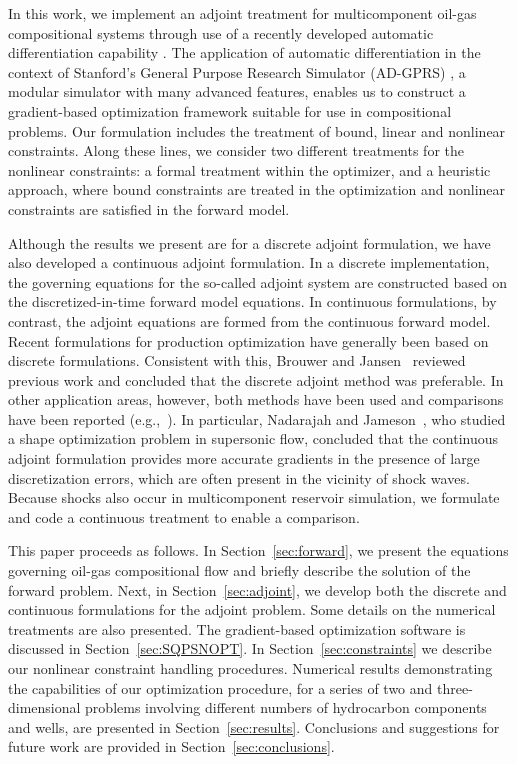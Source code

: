 \documentclass[twocolumn,numbook]{svjour3}          %
\begin{document}
In this work, we implement an adjoint treatment for multicomponent oil-gas
compositional systems through use of a recently developed automatic
differentiation capability \cite{Younis:2010}. The application of automatic
differentiation in the context of Stanford's General Purpose Research Simulator
(AD-GPRS) \cite{Cao:Thesis}, a modular simulator with many advanced features,
enables us to construct a gradient-based optimization framework suitable for
use in compositional problems. Our formulation includes the treatment of
bound, linear and nonlinear constraints. Along these lines, we consider two
different treatments for the nonlinear constraints: a formal treatment within
the optimizer, and a heuristic approach, where bound constraints are treated in the optimization and nonlinear constraints are satisfied in the forward model.


Although the results we present are for a discrete adjoint formulation,
we have also developed a continuous adjoint formulation. In a discrete
implementation, the governing equations for the so-called adjoint
system are constructed based on the discretized-in-time forward model
equations. In continuous formulations, by contrast, the adjoint
equations are formed from the continuous forward model. Recent
formulations for production optimization have generally been based on
discrete formulations. Consistent with this, Brouwer and Jansen~\cite{Brouwer:2004}
reviewed previous work and concluded that the discrete adjoint method
was preferable. In other application areas, however, both methods have
been used and comparisons have been reported
(e.g.,~\cite{Jameson:2007,Asouti:2008}). In particular, Nadarajah and
Jameson~\cite{Jameson:2007}, who studied a shape optimization problem
in supersonic flow, concluded that the continuous adjoint formulation
provides more accurate gradients in the presence of large
discretization errors, which are often present in the vicinity of shock
waves. Because shocks also occur in multicomponent reservoir simulation, we
formulate and code a continuous treatment to enable a comparison.

This paper proceeds as follows. In Section~\ref{sec:forward}, we present the
equations governing oil-gas compositional flow and briefly describe the solution
of the forward problem. Next, in Section~\ref{sec:adjoint}, we develop both the
discrete and continuous formulations for the adjoint problem. Some details on
the numerical treatments are also presented. The gradient-based optimization software is discussed in Section~\ref{sec:SQPSNOPT}.
In Section~\ref{sec:constraints} we describe our nonlinear constraint handling procedures. Numerical results
demonstrating the capabilities of our optimization procedure, for a series of
two and three-dimensional problems involving different numbers of
hydrocarbon components and wells, are presented in Section~\ref{sec:results}.
Conclusions and suggestions for future work are provided in
Section~\ref{sec:conclusions}.
\end{document}
